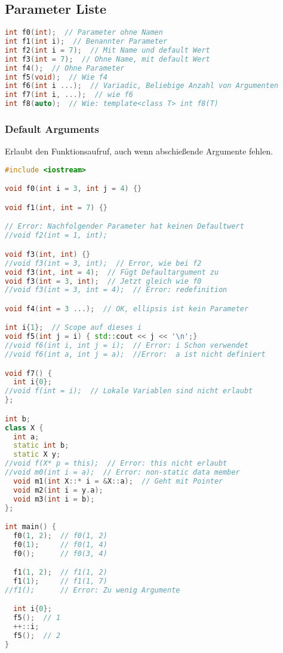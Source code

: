 \documentclass[10pt,twocolumn]{scrartcl}
\begin{document}
\subsection{Parameter Liste}

\begin{lstlisting}[language=C++]
int f0(int);  // Parameter ohne Namen
int f1(int i);  // Benannter Parameter
int f2(int i = 7);  // Mit Name und default Wert
int f3(int = 7);  // Ohne Name, mit default Wert
int f4();  // Ohne Parameter
int f5(void);  // Wie f4
int f6(int i ...);  // Variadic, Beliebige Anzahl von Argumenten
int f7(int i, ...);  // wie f6
int f8(auto);  // Wie: template<class T> int f8(T)
\end{lstlisting}

\subsubsection{Default Arguments}

Erlaubt den Funktionsaufruf, auch wenn abschießende Argumente fehlen.

\begin{lstlisting}[language=C++]
#include <iostream>

void f0(int i = 3, int j = 4) {}

void f1(int, int = 7) {}

// Error: Nachfolgender Parameter hat keinen Defaultwert
//void f2(int = 1, int);

void f3(int, int) {}
//void f3(int = 3, int);  // Error, wie bei f2
void f3(int, int = 4);  // Fügt Defaultargument zu
void f3(int = 3, int);  // Jetzt gleich wie f0
//void f3(int = 3, int = 4);  // Error: redefinition

void f4(int = 3 ...);  // OK, ellipsis ist kein Parameter

int i{1};  // Scope auf dieses i
void f5(int j = i) { std::cout << j << '\n';}
//void f6(int i, int j = i);  // Error: i Schon verwendet
//void f6(int a, int j = a);  //Error:  a ist nicht definiert

void f7() {
  int i{0};
//void f(int = i);  // Lokale Variablen sind nicht erlaubt
};

int b;
class X {
  int a;
  static int b;
  static X y;
//void f(X* p = this);  // Error: this nicht erlaubt
//void m0(int i = a);  // Error: non-static data member
  void m1(int X::* i = &X::a);  // Geht mit Pointer
  void m2(int i = y.a);
  void m3(int i = b);
};

int main() {
  f0(1, 2);  // f0(1, 2)
  f0(1);     // f0(1, 4)
  f0();      // f0(3, 4)

  f1(1, 2);  // f1(1, 2)
  f1(1);     // f1(1, 7)
//f1();      // Error: Zu wenig Argumente

  int i{0};
  f5();  // 1
  ++::i;
  f5();  // 2
}
\end{lstlisting}
\end{document}
